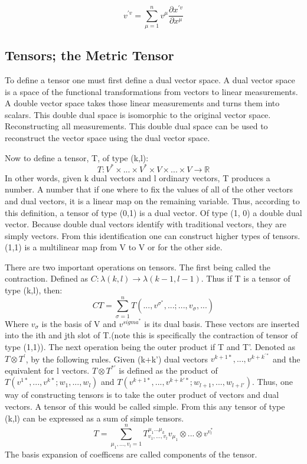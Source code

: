 $$v^{'v}=\sum_{\mu=1}^n v^\mu \frac{\partial x^{'v}}{\partial x^\mu}$$

\subsection{Tensors; the Metric Tensor}

To define a tensor one must first define a dual vector space. A dual vector space is a space of the functional transformations from vectors to linear measurements. A double vector space takes those linear measurements and turns them into scalars. This double dual space is isomorphic to the original vector space. Reconstructing all measurements. This double dual space can be used to reconstruct the vector space using the dual vector space.

Now to define a tensor, T, of type (k,l):
\[
T: V^* \times ... \times V^* \times V \times ... \times V \to \mathbb{R}
\]
In other words, given k dual vectors and l ordinary vectors, T produces a number. A number that if one where to fix the values of all of the other vectors and dual vectors, it is a linear map on the remaining variable. Thus, according to this definition, a tensor of type (0,1) is a dual vector. Of type (1, 0) a double dual vector. Because double dual vectors identify with traditional vectors, they are simply vectors. From this identification one can construct higher types of tensors. (1,1) is a multilinear map from V to V or for the other side.

There are two important operations on tensors. The first being called the contraction. Defined as $C: \lambda(k,l) \to \lambda (k-1, l-1)$. Thus if T is a tensor of type (k,l), then:
\[
CT= \sum_{\sigma=1}^n T(..., v^{\sigma^*},...;...,v_\sigma,...)
  \]
  Where $v_\sigma$ is the basis of V and $v^{sigma^*}$ is its dual basis. These vectors are inserted into the ith and jth slot of T.(note this is specifically the contraction of tensor of type (1,1)).
The next operation being the outer product if T and T'. Denoted as $T \otimes T^{'}$, by the following rules. Given (k+k') dual vectors $v^{k+1*},...,v^{k+k^{'*}}$ and the equivalent for l vectors. $T \otimes T^{*'}$ is defined as the product of $T(v^{1*},...,v^{k*};w_1,...,w_l)$ and $T(v^{k+1*},...,v^{k+k'*};w_{l+1},...,w_{l+l'})$. Thus, one way of constructing tensors is to take the outer product of vectors and dual vectors. A tensor of this would be called simple. From this any tensor of type (k,l) can be expressed as a sum of simple tensors.
\[
    T= \sum_{\mu_1,...,v_l=1}^n T^{\mu_1...\mu_k}_{v_1,...,v_l}v_{\mu_1} \otimes ... \otimes v^{v_l^*}
  \]
  The basis expansion of coefficens are called components of the tensor.

